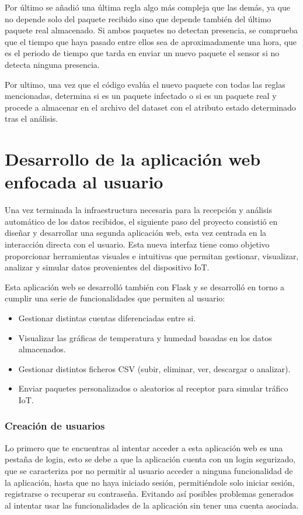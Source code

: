 Por último se añadió una última regla algo más compleja que las demás, ya que no depende solo del paquete recibido sino que depende también del último paquete real almacenado. Si ambos paquetes no detectan presencia, se comprueba que el tiempo que haya pasado entre ellos sea de aproximadamente una hora, que es el periodo de tiempo que tarda en enviar un nuevo paquete el sensor si no detecta ninguna presencia.


Por ultimo, una vez que el código evalúa el nuevo paquete con todas las reglas mencionadas, determina si es un paquete infectado o si es un paquete real y procede a almacenar en el archivo del dataset con el atributo estado determinado tras el análisis.


\section{Desarrollo de la aplicación web enfocada al usuario }

Una vez terminada la infraestructura necesaria para la recepción y análisis automático de los datos recibidos, el siguiente paso del proyecto consistió en diseñar y desarrollar una segunda aplicación web, esta vez centrada en la interacción directa con el usuario. Esta nueva interfaz tiene como objetivo proporcionar herramientas visuales e intuitivas que permitan gestionar, visualizar, analizar y simular datos provenientes del dispositivo IoT.

Esta aplicación web se desarrolló también con Flask y se desarrolló en torno a cumplir una serie de funcionalidades que permiten al usuario:

\begin{itemize}
    \item Gestionar distintas cuentas diferenciadas entre si.
    \item Visualizar las gráficas de temperatura y humedad basadas en los datos almacenados.
    \item Gestionar distintos ficheros CSV (subir, eliminar, ver, descargar o analizar).
    \item Enviar paquetes personalizados o aleatorios al receptor para simular tráfico IoT.
\end{itemize}


\subsubsection{Creación de usuarios}
Lo primero que te encuentras al intentar acceder a esta aplicación web es una pestaña de login, esto se debe a que la aplicación cuenta con un login segurizado, que se caracteriza por no permitir al usuario acceder a ninguna funcionalidad de la aplicación, hasta que no haya iniciado sesión, permitiéndole solo iniciar sesión, registrarse o recuperar su contraseña. Evitando así posibles problemas generados al intentar usar las funcionalidades de la aplicación sin tener una cuenta asociada.  

